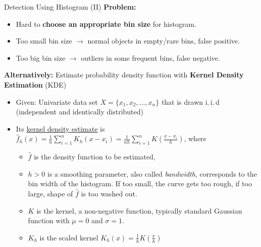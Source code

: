 \begin{frame}{Detection Using Histogram (II)}
	\textbf{Problem:}
	\begin{itemize}
		\item Hard to \textbf{\color{airforceblue}choose an appropriate bin size} for histogram.
		\item Too small bin size $\rightarrow$ normal objects in empty/rare bins, false positive.
		\item Too big bin size $\rightarrow$ outliers in some frequent bins, false negative.
	\end{itemize}
	\vspace*{1em}
	\textbf{Alternatively:} Estimate probability density function with \textbf{Kernel Density Estimation} (KDE)
	\begin{itemize}
		\item Given: Univariate data set $X=\{x_1, x_2, \dots, x_n\}$ that is drawn i.\,i.\,d (independent and identically distributed)
		\item Its \underline{kernel density estimate} is $\hat{f}_h(x)=\frac{1}{n}\sum_{i=1}^n K_h(x-x_i) = \frac{1}{nh}\sum_{i=1}^n K(\frac{x-x_i}{h})$, where
		      \begin{itemize}
			      \item $\hat{f}$ is the density function to be estimated,
			      \item $h>0$ is a smoothing parameter, also called \textit{bandwidth}, corresponds to the bin width of the histogram. If too small, the curve gets too rough, if too large, shape of $\hat{f}$ is too washed out.
			      \item $K$ is the kernel, a non-negative function, typically standard Gaussian function with $\mu=0$ and $\sigma=1$.
			      \item $K_h$ is the scaled kernel $K_h(x)=\frac{1}{h} K(\frac{x}{h})$
		      \end{itemize}
	\end{itemize}
\end{frame}
